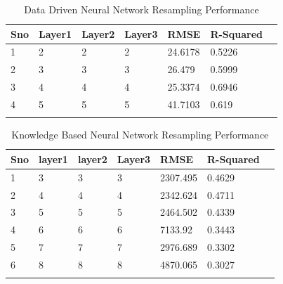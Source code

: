 \documentclass[preprint,12pt]{elsarticle}
\begin{document}
\begin{table}[H]
\centering
\caption{Data Driven Neural Network Resampling Performance}
\begin{tabular}{lllllll}
\hline
Sno & Layer1 & Layer2 & Layer3 & RMSE & R-Squared &        \\
\hline
1      & 2      & 2      & 2    & 24.6178   & 0.5226 \\
2      & 3      & 3      & 3    & 26.479    & 0.5999 \\
3      & 4      & 4      & 4    & 25.3374   & 0.6946 \\
4      & 5      & 5      & 5    & 41.7103   & 0.619 \\
\hline
\label{tab:DDNN}
\end{tabular}
\end{table}


\begin{table}[H]
\centering
\caption{Knowledge Based Neural Network Resampling Performance}

\begin{tabular}{lllllll}
\hline
Sno & layer1 & layer2 & Layer3 & RMSE     & R-Squared \\
\hline
1   & 3      & 3      & 3      & 2307.495 & 0.4629    \\
2   & 4      & 4      & 4      & 2342.624 & 0.4711    \\
3   & 5      & 5      & 5      & 2464.502 & 0.4339    \\
4   & 6      & 6      & 6      & 7133.92  & 0.3443    \\
5   & 7      & 7      & 7      & 2976.689 & 0.3302    \\
6   & 8      & 8      & 8      & 4870.065 & 0.3027   \\
\hline
\label{tab:KBNN}
\end{tabular}
\end{table}
\end{document}
